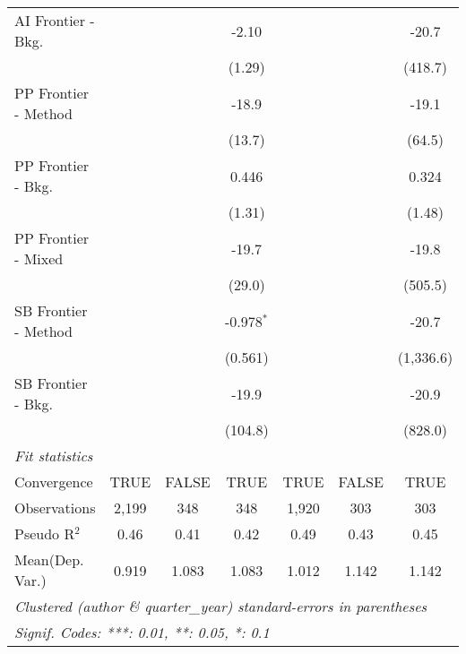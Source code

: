 \begin{tabular}{lcccccc}
   AI Frontier - Bkg.   &              &             & -2.10         &              &               & -20.7\\   
                        &              &             & (1.29)        &              &               & (418.7)\\   
   PP Frontier - Method &              &             & -18.9         &              &               & -19.1\\   
                        &              &             & (13.7)        &              &               & (64.5)\\   
   PP Frontier - Bkg.   &              &             & 0.446         &              &               & 0.324\\   
                        &              &             & (1.31)        &              &               & (1.48)\\   
   PP Frontier - Mixed  &              &             & -19.7         &              &               & -19.8\\   
                        &              &             & (29.0)        &              &               & (505.5)\\   
   SB Frontier - Method &              &             & -0.978$^{*}$  &              &               & -20.7\\   
                        &              &             & (0.561)       &              &               & (1,336.6)\\   
   SB Frontier - Bkg.   &              &             & -19.9         &              &               & -20.9\\   
                        &              &             & (104.8)       &              &               & (828.0)\\   
   \midrule
   \emph{Fit statistics}\\
   Convergence          &TRUE          & FALSE       & TRUE          & TRUE         & FALSE         & TRUE\\  
   Observations         & 2,199        & 348         & 348           & 1,920        & 303           & 303\\  
   Pseudo R$^2$         & 0.46         & 0.41        & 0.42          & 0.49         & 0.43          & 0.45\\  
Mean(Dep. Var.) & 0.919 & 1.083 & 1.083 & 1.012 & 1.142 & 1.142 \\
   \midrule \midrule
   \multicolumn{7}{l}{\emph{Clustered (author \& quarter\_year) standard-errors in parentheses}}\\
   \multicolumn{7}{l}{\emph{Signif. Codes: ***: 0.01, **: 0.05, *: 0.1}}\\
\end{tabular}
\par\endgroup
